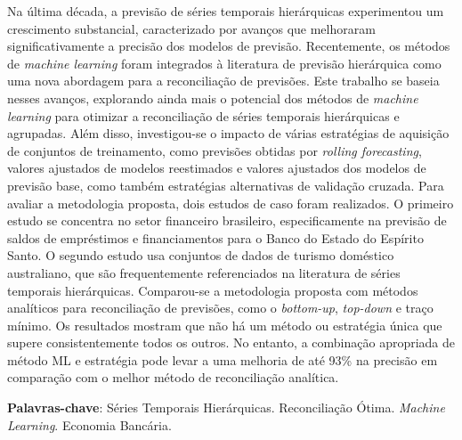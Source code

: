 
\setlength{\absparsep}{18pt}
\begin{resumo}
  Na última década, a previsão de séries temporais hierárquicas experimentou um crescimento substancial, caracterizado por avanços que melhoraram significativamente a precisão dos modelos de previsão. Recentemente, os métodos de \textit{machine learning} foram integrados à literatura de previsão hierárquica como uma nova abordagem para a reconciliação de previsões. Este trabalho se baseia nesses avanços, explorando ainda mais o potencial dos métodos de \textit{machine learning} para otimizar a reconciliação de séries temporais hierárquicas e agrupadas. Além disso, investigou-se o impacto de várias estratégias de aquisição de conjuntos de treinamento, como previsões obtidas por \textit{rolling forecasting}, valores ajustados de modelos reestimados e valores ajustados dos modelos de previsão base, como também estratégias alternativas de validação cruzada. Para avaliar a metodologia proposta, dois estudos de caso foram realizados. O primeiro estudo se concentra no setor financeiro brasileiro, especificamente na previsão de saldos de empréstimos e financiamentos para o Banco do Estado do Espírito Santo. O segundo estudo usa conjuntos de dados de turismo doméstico australiano, que são frequentemente referenciados na literatura de séries temporais hierárquicas. Comparou-se a metodologia proposta com métodos analíticos para reconciliação de previsões, como o \textit{bottom-up}, \textit{top-down} e traço mínimo. Os resultados mostram que não há um método ou estratégia única que supere consistentemente todos os outros. No entanto, a combinação apropriada de método ML e estratégia pode levar a uma melhoria de até 93\% na precisão em comparação com o melhor método de reconciliação analítica.

  \textbf{Palavras-chave}: Séries Temporais Hierárquicas. Reconciliação Ótima. \textit{Machine Learning}. Economia Bancária.
\end{resumo}


